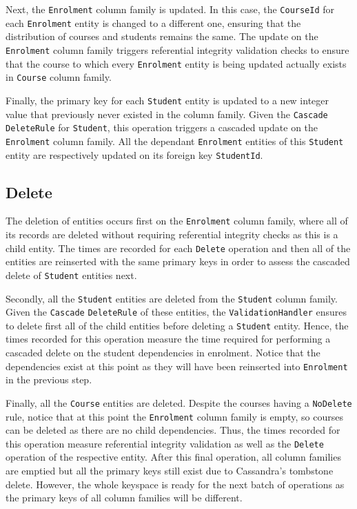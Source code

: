 Next,  the \texttt{Enrolment} column family is updated.  In this case,  the
\texttt{CourseId} for each \texttt{Enrolment} entity is changed to a different
one,  ensuring that the distribution of courses and students remains the same. 
The update on the \texttt{Enrolment} column family triggers referential
integrity validation checks to ensure that the course to which every
\texttt{Enrolment} entity is being updated actually exists in \texttt{Course}
column family. 
					
Finally,  the primary key for each \texttt{Student} entity is updated to a new
integer value that previously  never existed in the column family.  Given the
\texttt{Cascade} \texttt{DeleteRule} for \texttt{Student},  this operation
triggers a cascaded update on the
\texttt{Enrolment} column family.  
All the dependant \texttt{Enrolment} entities of this \texttt{Student} entity
are respectively updated on its foreign key \texttt{StudentId}. 
		
\subsection{Delete} The deletion of entities occurs first on the
\texttt{Enrolment} column family,  where all of its records are deleted without
requiring referential integrity checks as this is a child entity.  The times are
recorded for each \texttt{Delete} operation and then all of the entities are
reinserted with the same primary keys in order to assess the cascaded delete of
\texttt{Student} entities next. 
				
Secondly,  all  the \texttt{Student} entities are deleted from the
\texttt{Student} column family.  Given the \texttt{Cascade} \texttt{DeleteRule} of these entities,  the
\texttt{ValidationHandler} ensures to delete first all of the child entities
before deleting a \texttt{Student} entity. 
Hence,  the times recorded for this operation measure the time required for
performing a cascaded delete on the student dependencies in enrolment.  Notice
that the dependencies exist at this point as they will have been reinserted into
\texttt{Enrolment} in the previous step. 
				
Finally,  all the \texttt{Course} entities are deleted.  Despite the courses
having a \texttt{NoDelete} rule,  notice that at this point the
\texttt{Enrolment} column family is empty,  so courses can be deleted as there
are no child dependencies.  Thus,  the times recorded for this operation measure
referential integrity validation as well as the \texttt{Delete} operation
of the respective entity.  After this final operation,  all column families are
emptied but all the primary keys still exist due to Cassandra's tombstone
delete.  However,  the whole keyspace is ready for the next batch of operations as
the primary keys of all column families will be different. 
	
	